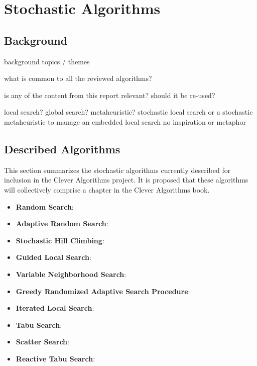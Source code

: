\documentclass[a4paper, 11pt]{article}
\begin{document}
% 
% 
\section{Stochastic Algorithms}
\label{sec:algorithms}

% 
% 
\subsection{Background}
background topics / themes

what is common to all the reviewed algorithms?

is any of the content from this report relevant? should it be re-used? \cite{Brownlee2010n}

local search? global search? metaheuristic?
stochastic local search or a stochastic metaheuristic to manage an embedded local search
no inspiration or metaphor 


% 
% 
\subsection{Described Algorithms}
This section summarizes the stochastic algorithms currently described for inclusion in the Clever Algorithms project. It is proposed that these algorithms will collectively comprise a chapter in the Clever Algorithms book. 

\begin{itemize}
	\item \textbf{Random Search}: \cite{Brownlee2010g}
	\item \textbf{Adaptive Random Search}: \cite{Brownlee2010h}
	\item \textbf{Stochastic Hill Climbing}: \cite{Brownlee2010i}
	\item \textbf{Guided Local Search}: \cite{Brownlee2010j}
	\item \textbf{Variable Neighborhood Search}: \cite{Brownlee2010e}
	\item \textbf{Greedy Randomized Adaptive Search Procedure}: \cite{Brownlee2010d}
	\item \textbf{Iterated Local Search}: \cite{Brownlee2010k}
	\item \textbf{Tabu Search}: \cite{Brownlee2010f}
	\item \textbf{Scatter Search}: \cite{Brownlee2010l}
	\item \textbf{Reactive Tabu Search}: \cite{Brownlee2010m}
\end{itemize}
\end{document}
